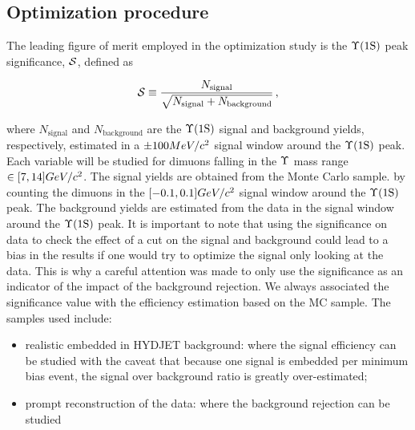 \subsection{Optimization procedure}
The leading figure of merit employed in the optimization study is the $\Upsilon\text{(1S)}$ {peak significance}, ${\cal{S}}$, defined as
%
\begin{linenomath}
\begin{equation}
{\cal{S}} \equiv \frac{N_\text{signal}}{\sqrt{N_\text{signal}+N_\text{background}}} \,,
\label{eqn:peak_signif}
\end{equation}
\end{linenomath}
%
where $N_\text{signal}$ and $N_\text{background}$ are the $\Upsilon\text{(1S)}$ signal and background yields, respectively, estimated in a $\pm 100 MeV/c^{2}$ signal window around the $\Upsilon\text{(1S)}$ peak. 
Each variable will be studied for dimuons falling in the $\Upsilon$ mass range $\in[7, 14] GeV/c^{2}$. 
The signal yields are obtained from the Monte Carlo sample.  by counting the dimuons in the $[-0.1, 0.1] GeV/c^{2}$ signal window around the $\Upsilon\text{(1S)}$ peak. 
The background yields are estimated from the data in the signal window around the $\Upsilon\text{(1S)}$ peak. 
%
It is important to note that using the significance on data to check the effect of a cut on the signal and background could lead to a bias in the results if 
one would try to optimize the signal only looking at the data. This is why a careful attention was made to only use the significance as an indicator of the impact of the background 
rejection. We always associated the significance value with the efficiency estimation based on the MC sample.
The samples used include:
\begin{itemize}
\item realistic \PgU embedded in HYDJET \PbPb background: where the signal efficiency can be studied with the caveat that because one signal is embedded per minimum bias event, 
the signal over background ratio is greatly over-estimated;
\item prompt reconstruction of the data: where the background rejection can be studied   
\end{itemize}

